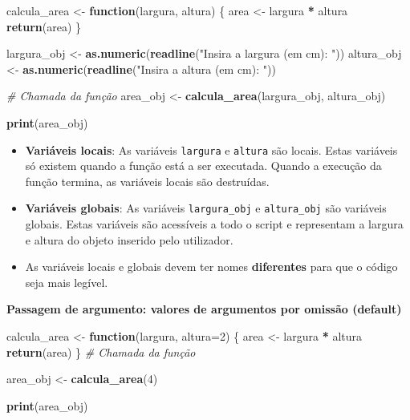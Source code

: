 \documentclass[
]{book}
\newenvironment{Shaded}{\begin{snugshade}}{\end{snugshade}}
\newcommand{\AttributeTok}[1]{\textcolor[rgb]{0.13,0.29,0.53}{#1}}
\newcommand{\CommentTok}[1]{\textcolor[rgb]{0.56,0.35,0.01}{\textit{#1}}}
\newcommand{\ControlFlowTok}[1]{\textcolor[rgb]{0.13,0.29,0.53}{\textbf{#1}}}
\newcommand{\DecValTok}[1]{\textcolor[rgb]{0.00,0.00,0.81}{#1}}
\newcommand{\FunctionTok}[1]{\textcolor[rgb]{0.13,0.29,0.53}{\textbf{#1}}}
\newcommand{\NormalTok}[1]{#1}
\newcommand{\OtherTok}[1]{\textcolor[rgb]{0.56,0.35,0.01}{#1}}
\newcommand{\SpecialCharTok}[1]{\textcolor[rgb]{0.81,0.36,0.00}{\textbf{#1}}}
\newcommand{\StringTok}[1]{\textcolor[rgb]{0.31,0.60,0.02}{#1}}
\begin{document}
\begin{Shaded}
\begin{Highlighting}[]
\NormalTok{calcula\_area }\OtherTok{\textless{}{-}} \ControlFlowTok{function}\NormalTok{(largura, altura) \{}
\NormalTok{  area }\OtherTok{\textless{}{-}}\NormalTok{ largura }\SpecialCharTok{*}\NormalTok{ altura}
  \FunctionTok{return}\NormalTok{(area)}
\NormalTok{\}}

\NormalTok{largura\_obj }\OtherTok{\textless{}{-}} \FunctionTok{as.numeric}\NormalTok{(}\FunctionTok{readline}\NormalTok{(}\StringTok{"Insira a largura (em cm): "}\NormalTok{))}
\NormalTok{altura\_obj }\OtherTok{\textless{}{-}} \FunctionTok{as.numeric}\NormalTok{(}\FunctionTok{readline}\NormalTok{(}\StringTok{"Insira a altura (em cm): "}\NormalTok{))}

\CommentTok{\# Chamada da função}
\NormalTok{area\_obj }\OtherTok{\textless{}{-}} \FunctionTok{calcula\_area}\NormalTok{(largura\_obj, altura\_obj) }

\FunctionTok{print}\NormalTok{(area\_obj)}
\end{Highlighting}
\end{Shaded}

\begin{itemize}
\item
  \textbf{Variáveis locais}: As variáveis \texttt{largura} e \texttt{altura} são locais. Estas variáveis só existem quando a função está a ser executada. Quando a execução da função termina, as variáveis locais são destruídas.
\item
  \textbf{Variáveis globais}: As variáveis \texttt{largura\_obj} e \texttt{altura\_obj} são variáveis globais. Estas variáveis são acessíveis a todo o script e representam a largura e altura do objeto inserido pelo utilizador.
\item
  As variáveis locais e globais devem ter nomes \textbf{diferentes} para que o código seja mais legível.
\end{itemize}

\textbf{Passagem de argumento: valores de argumentos por omissão (default)}

\begin{Shaded}
\begin{Highlighting}[]
\NormalTok{calcula\_area }\OtherTok{\textless{}{-}} \ControlFlowTok{function}\NormalTok{(largura, }\AttributeTok{altura=}\DecValTok{2}\NormalTok{) \{ }
\NormalTok{  area }\OtherTok{\textless{}{-}}\NormalTok{ largura }\SpecialCharTok{*}\NormalTok{ altura  }
  \FunctionTok{return}\NormalTok{(area)}
\NormalTok{\}}
\CommentTok{\# Chamada da função}

\NormalTok{area\_obj }\OtherTok{\textless{}{-}} \FunctionTok{calcula\_area}\NormalTok{(}\DecValTok{4}\NormalTok{) }

\FunctionTok{print}\NormalTok{(area\_obj)}
\end{Highlighting}
\end{Shaded}
\end{document}

